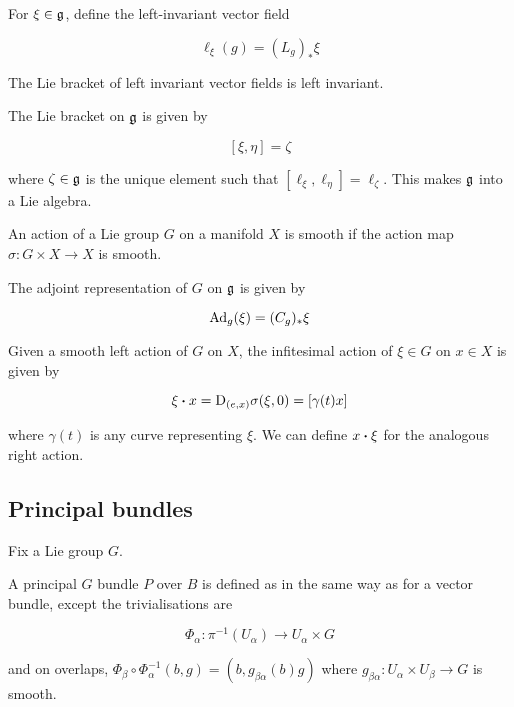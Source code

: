 \begin{notation}
    For \(\xi \in \mathfrak{g}\), define the left-invariant vector field

    \[\ell_\xi(g) = (L_g)_*\xi\]
\end{notation}

\begin{lemma}
    The Lie bracket of left invariant vector fields is left invariant.
\end{lemma}

\begin{definition}
     The Lie bracket on \(\mathfrak{g}\) is given by

    \[[\xi, \eta] = \zeta\]

    where \(\zeta \in \mathfrak{g}\) is the unique element such that \([\ell_\xi, \ell_\eta] = \ell_\zeta\). This makes \(\mathfrak{g}\) into a Lie algebra.
\end{definition}

\begin{definition}
     An action of a Lie group \(G\) on a manifold \(X\) is smooth if the action map \(\sigma : G \times X \to X\) is smooth.
\end{definition}

\begin{definition}
     The adjoint representation of \(G\) on \(\mathfrak{g}\) is given by

    \[\operatorname{Ad}_g(\xi) = (C_g)_*\xi\]
\end{definition}

\begin{definition}
     Given a smooth left action of \(G\) on \(X\), the infitesimal action of \(\xi \in G\) on \(x\in X\) is given by

    \[\xi\vdot x = \DD_{(e, x)}\sigma(\xi, 0) = [\gamma(t)x]\]

    where \(\gamma(t)\) is any curve representing \(\xi\). We can define \(x \vdot \xi\) for the analogous right action.
\end{definition}

\subsection{Principal bundles}

Fix a Lie group \(G\).

\begin{definition}
     A principal \(G\) bundle \(P\) over \(B\) is defined as in the same way as for a vector bundle, except the trivialisations are 

    \[\Phi_\alpha : \pi^{-1}(U_\alpha) \to U_\alpha \times G\]

    and on overlaps, \(\Phi_\beta \circ \Phi_\alpha^{-1}(b, g) = (b, g_{\beta\alpha}(b)g)\) where \(g_{\beta\alpha} : U_\alpha \times U_\beta \to G\) is smooth.
\end{definition}

